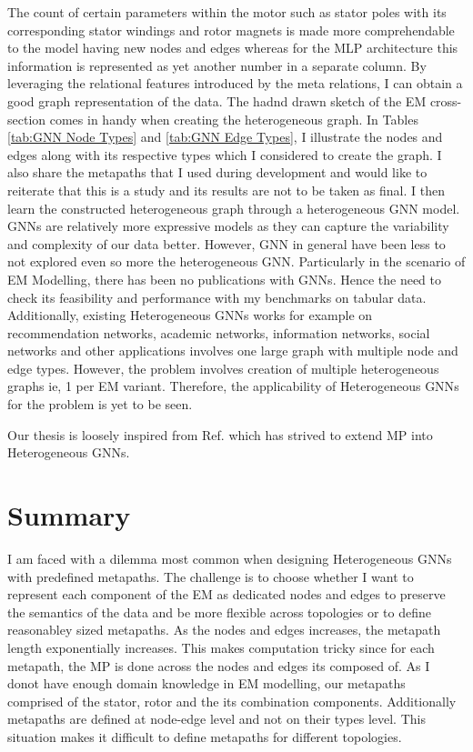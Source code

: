\documentclass{report} %
\begin{document}
The count of certain parameters within the motor such as stator poles with its corresponding stator windings and rotor magnets is made more comprehendable to the 
model having new nodes and edges whereas for the \ac{MLP} architecture this information is represented as yet another number in a separate column. 
By leveraging the relational features introduced by the meta relations, I can obtain a good graph representation of the data.
The hadnd drawn sketch of the \ac{EM} cross-section comes in handy when creating the heterogeneous graph. In Tables \ref{tab:GNN Node Types} and \ref{tab:GNN Edge Types}, 
I illustrate the nodes and edges along with its respective types which I considered to create the graph. I also share the metapaths that I used during development and 
would like to reiterate that this is a study and its results are not to be taken as final.
I then learn the constructed heterogeneous graph through a heterogeneous \ac{GNN} model.  \\

\ac{GNN}s are relatively more expressive models as they can capture the variability and complexity of our data better.
However, \ac{GNN} in general have been less to not explored even so more the heterogeneous \ac{GNN}.
Particularly in the scenario of \ac{EM} Modelling, there has been no publications with \ac{GNN}s.
Hence the need to check its feasibility and performance with my benchmarks on tabular data.
Additionally, existing Heterogeneous \ac{GNN}s works for example on recommendation networks, academic networks, information networks, social networks and other applications 
involves one large graph with multiple node and edge types. 
However, the problem involves creation of multiple heterogeneous graphs ie, 1 per \ac{EM} variant. Therefore, the applicability of Heterogeneous \ac{GNN}s for the 
problem is yet to be seen.

Our thesis is loosely inspired from Ref. \cite{ML HGNN-2023} which has strived to extend \ac{MP} into Heterogeneous \ac{GNN}s.

\section{Summary}\label{sec:EM Heterogeneous GNN Discussion}
I am faced with a dilemma most common when designing Heterogeneous \ac{GNN}s with predefined metapaths.
The challenge is to choose whether I want to represent each component of the \ac{EM} as dedicated nodes and edges to preserve the semantics of the data and be more flexible 
across topologies or to define reasonabley sized metapaths. As the nodes and edges increases, the metapath length exponentially increases.
This makes computation tricky since for each metapath, the \ac{MP} is done across the nodes and edges its composed of.
As I donot have enough domain knowledge in \ac{EM} modelling, our metapaths comprised of the stator, rotor and the its combination components.
Additionally metapaths are defined at node-edge level and not on their types level. This situation makes it difficult to define metapaths for different topologies.
\end{document}
